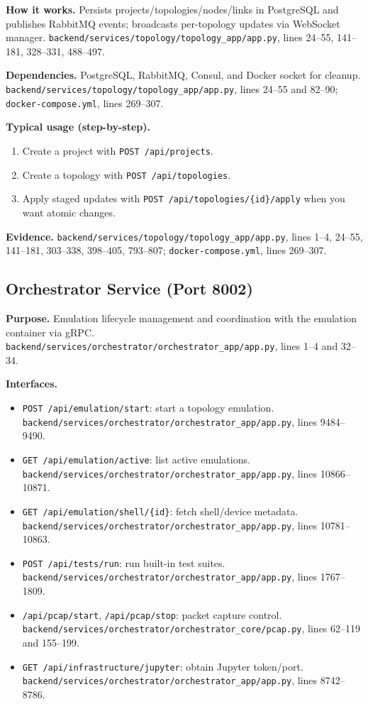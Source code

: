 \documentclass[conference]{IEEEtran}
\begin{document}
\textbf{How it works.} Persists projects/topologies/nodes/links in PostgreSQL and publishes RabbitMQ events; broadcasts per-topology updates via WebSocket manager. \texttt{backend/services/topology/topology\_app/app.py}, lines 24--55, 141--181, 328--331, 488--497.

\textbf{Dependencies.} PostgreSQL, RabbitMQ, Consul, and Docker socket for cleanup. \texttt{backend/services/topology/topology\_app/app.py}, lines 24--55 and 82--90; \texttt{docker-compose.yml}, lines 269--307.

\textbf{Typical usage (step-by-step).}
\begin{enumerate}
\item Create a project with \texttt{POST /api/projects}.
\item Create a topology with \texttt{POST /api/topologies}.
\item Apply staged updates with \texttt{POST /api/topologies/\{id\}/apply} when you want atomic changes.
\end{enumerate}

\textbf{Evidence.} \texttt{backend/services/topology/topology\_app/app.py}, lines 1--4, 24--55, 141--181, 303--338, 398--405, 793--807; \texttt{docker-compose.yml}, lines 269--307.

\subsection{Orchestrator Service (Port 8002)}
\textbf{Purpose.} Emulation lifecycle management and coordination with the emulation container via gRPC. \texttt{backend/services/orchestrator/orchestrator\_app/app.py}, lines 1--4 and 32--34.

\textbf{Interfaces.}
\begin{itemize}
\item \texttt{POST /api/emulation/start}: start a topology emulation. \texttt{backend/services/orchestrator/orchestrator\_app/app.py}, lines 9484--9490.
\item \texttt{GET /api/emulation/active}: list active emulations. \texttt{backend/services/orchestrator/orchestrator\_app/app.py}, lines 10866--10871.
\item \texttt{GET /api/emulation/shell/\{id\}}: fetch shell/device metadata. \texttt{backend/services/orchestrator/orchestrator\_app/app.py}, lines 10781--10863.
\item \texttt{POST /api/tests/run}: run built-in test suites. \texttt{backend/services/orchestrator/orchestrator\_app/app.py}, lines 1767--1809.
\item \texttt{/api/pcap/start}, \texttt{/api/pcap/stop}: packet capture control. \texttt{backend/services/orchestrator/orchestrator\_core/pcap.py}, lines 62--119 and 155--199.
\item \texttt{GET /api/infrastructure/jupyter}: obtain Jupyter token/port. \texttt{backend/services/orchestrator/orchestrator\_app/app.py}, lines 8742--8786.
\end{itemize}
\end{document}

